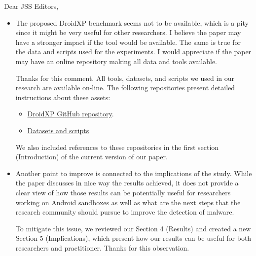 \documentclass[12pt,english]{scrartcl}
\begin{document}
\begin{letter}{Dear JSS Editors,}
\begin{itemize}
\vspace{0.2cm}

\item The proposed DroidXP benchmark seems not to be available, which is a pity since it might be very useful for other 
researchers. I believe the paper may have a stronger impact if the tool would be available. The same is true for the 
data and scripts used for the experiments. I would appreciate if the paper may have an online repository making all 
data and tools available.


\vspace{0.2cm}

{\color{blue}{\bf Answer.} Thanks for this comment. All tools, datasets, and scripts we used in our research are available on-line. The following repositories present detailed instructions about these assets: 

  \begin{itemize}
    \item \href{https://github.com/droidxp/benchmark}{DroidXP GitHub repository}.
    \item \href{https://htmlpreview.github.io/?https://github.com/droidxp/paper-replication-package/blob/master/replication.html}{Datasets and scripts}
  \end{itemize}
  
  \vspace{0.2cm}
  
  We also included references to these repositories in the first section (Introduction) of the current version of
  our paper.}

\vspace{0.2cm}

\item Another point to improve is connected to the implications of the study. While the paper discusses in nice way the 
results achieved, it does not provide a clear view of how those results can be potentially useful for researchers 
working on Android sandboxes as well as what are the next steps that the research community should pursue to 
improve the detection of malware.


\vspace{0.2cm}

{\color{blue}{\bf Answer.} To mitigate this issue, we reviewed our Section 4 (Results) and created a new Section 5 (Implications), which present how our results can be useful for both researchers and practitioner. Thanks for this observation.}


\vspace{0.2cm}


\end{itemize}
\end{letter}
\end{document}
